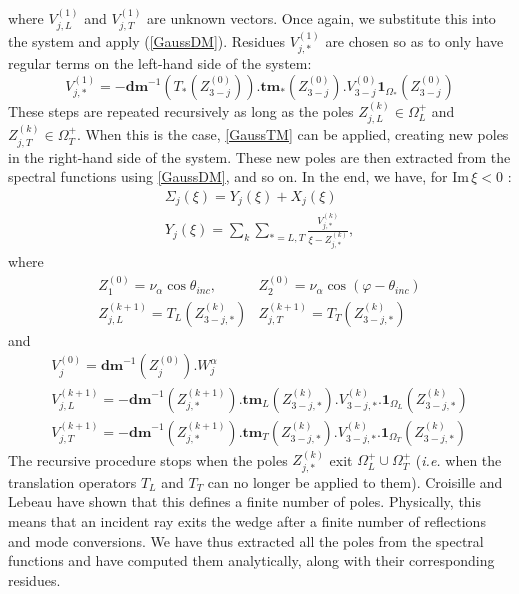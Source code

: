 where $V_{j,L}^{(1)}$ and $V_{j,T}^{(1)}$ are unknown vectors. Once again, we substitute this into the system and apply (\ref{GaussDM}). 
Residues $V_{j,*}^{(1)}$ are chosen so as to only have regular terms on the left-hand side of the system:
\begin{equation}
V_{j,*}^{(1)}=-\textbf{dm}^{-1}(T_*(Z_{3-j}^{(0)})).\textbf{tm}_*(Z_{3-j}^{(0)}).V_{3-j}^{(0)}\mathbf{1}_{\Omega_*}(Z_{3-j}^{(0)})
\end{equation}
These steps are repeated recursively as long as the poles $Z_{j,L}^{(k)} \in \Omega_L^+$ and $Z_{j,T}^{(k)} \in \Omega_T^+$. When this is the case, \eqref{GaussTM} can be applied, creating new poles in the right-hand side of the system. These new poles are then extracted from the spectral functions using \eqref{GaussDM}, and so on. In the end, we have, for $\mbox{Im}\, \xi <0$ :
\begin{gather}
\Sigma_j(\xi)=Y_j(\xi)+X_j(\xi) \label{decomp}\\
Y_j(\xi)=\sum_k \sum_{*=L,T} \frac{V_{j,*}^{(k)}}{\xi-Z_{j,*}^{(k)}}
\label{yj},
\end{gather}
where
\begin{equation}
\begin{matrix}
Z_{1}^{(0)}=\nu_{\alpha} \cos \theta_{inc},  & Z_{2}^{(0)}=\nu_{\alpha} \cos(\varphi-\theta_{inc}) \\
Z_{j,L}^{(k+1)}= T_L(Z_{3-j,*}^{(k)}) &Z_{j,T}^{(k+1)}= T_T(Z_{3-j,*}^{(k)}) 
\end{matrix}
\end{equation}
and
\begin{equation}
\begin{matrix}
V_{j}^{(0)}=\textbf{dm}^{-1}(Z_{j}^{(0)}).W_j^{\alpha}\\
V_{j,L}^{(k+1)}=-\textbf{dm}^{-1}(Z_{j,*}^{(k+1)}).\textbf{tm}_L(Z_{3-j,*}^{(k)}).V_{3-j,*}^{(k)}.\textbf{1}_{\Omega_L}(Z_{3-j,*}^{(k)}) \\ 
V_{j,T}^{(k+1)}=-\textbf{dm}^{-1}(Z_{j,*}^{(k+1)}).\textbf{tm}_T(Z_{3-j,*}^{(k)}).V_{3-j,*}^{(k)}.\textbf{1}_{\Omega_T}(Z_{3-j,*}^{(k)}) 
\end{matrix}
\label{residus}
\end{equation}
The recursive procedure stops when the poles $Z_{j,*}^{(k)}$ exit $\Omega_L^+\cup\Omega_T^+$ (\textit{i.e.} when the translation operators $T_L$ and $T_T$ can no longer be applied to them). Croisille and Lebeau \cite{CroisilleLebeau} have shown that this defines a finite number of poles. Physically, this means that an incident ray exits the wedge after a finite number of reflections and mode conversions. We have thus extracted all the poles from the spectral functions and have computed them analytically, along with their corresponding residues. 


